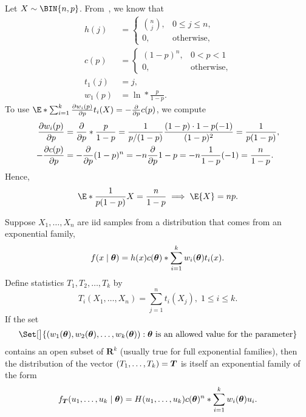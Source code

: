 \begin{Example}{}{}
    Let $ X \sim \BIN{n,p} $. From~, we know that
    \begin{align*}
        h(j)   & =\begin{cases}
                      \binom{n}{j}, & 0\le j\le n,      \\
                      0,            & \text{otherwise},
                  \end{cases} \\
        c(p)   & =\begin{cases}
                      (1-p)^n, & 0<p<1             \\
                      0,       & \text{otherwise},
                  \end{cases}      \\
        t_1(j) & =j,                                \\
        w_1(p) & =\ln*{\frac{p}{1-p}}.
    \end{align*}
    To use $ \E*{\sum_{i=1}^{k}\pdv{w_i(p)}{p}t_i(X)}=-\pdv*{\ln{c(p)}}{p} $, we compute
    \begin{align*}
        \pdv{w_i(p)}{p}     & =\pdv*{\relax*{\frac{p}{1-p}}}{p}=\frac{1}{p/(1-p)}\frac{(1-p)\cdot 1-p(-1)}{(1-p)^2}=\frac{1}{p(1-p)}, \\
        -\pdv{\relax{c(p)}}{p} & =-\pdv*{\relax{(1-p)^n}}{p}=-n\pdv*{\relax{1-p}}{p}=-n\frac{1}{1-p}(-1)=\frac{n}{1-p}.
    \end{align*}
    Hence,
    \[ \E*{\frac{1}{p(1-p)}X}=\frac{n}{1-p}\implies \E{X}=np. \]
\end{Example}
\begin{Theorem}{}{}
    Suppose $ X_1,\ldots,X_n $ are iid samples from a distribution that comes from an exponential family,
    \[ f(x\mid \bm{\theta})=h(x)c(\bm{\theta})\relax*{\sum_{i=1}^{k}w_i(\bm{\theta})t_i(x)}. \]
    Define statistics $ T_1,T_2,\ldots,T_k $ by
    \[ T_i(X_1,\ldots,X_n)=\sum_{j=1}^{n}t_i(X_j),\; 1\le i\le k. \]
    If the set
    \[ \Set[\big]{(w_1(\Vector{\theta}),w_2(\Vector{\theta}),\ldots,w_k(\Vector{\theta}))\given \Vector{\theta}\text{ is an allowed value for the parameter}} \]
    contains an open subset of $ \mathbf{R}^k $ (usually true for full exponential families), then
    the distribution of the vector $ (T_1,\ldots,T_k)=\bm{T} $ is itself an exponential family of the form
    \[ f_{\bm{T}}(u_1,\ldots,u_k\mid \bm{\theta})=H(u_1,\ldots,u_k)c(\bm{\theta})^n\relax*{\sum_{i=1}^{k}w_i(\bm{\theta})u_i}. \]
\end{Theorem}